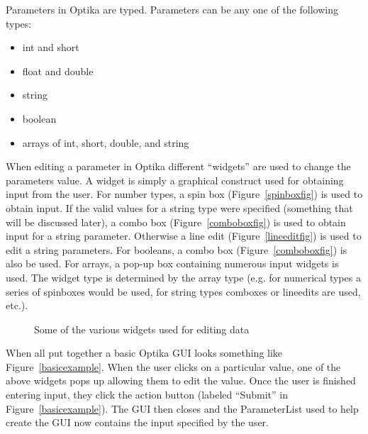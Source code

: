 Parameters in Optika are typed. Parameters can be any one of the following types:
	\begin{itemize}
		\item int and short
		\item float and double
		\item string
		\item boolean
		\item arrays of int, short, double, and string
	\end{itemize}
When editing a parameter in Optika different ``widgets'' are used to change the parameters value. A widget is simply
a graphical construct used for obtaining input from the user. For number types, a spin box (Figure~\ref{spinboxfig}) is used to obtain input. 
If the valid values for a string type were specified (something that will be discussed later), a combo box (Figure~\ref{comboboxfig}) is used to obtain
input for a string parameter.
Otherwise a line edit (Figure~\ref{lineeditfig}) is used to edit a string parameters. For booleans, a combo box (Figure~\ref{comboboxfig}) 
is also be used. For arrays, a pop-up box containing numerous input widgets is used. The widget type is determined by the
array type (e.g. for numerical types a series of spinboxes would be used, for string types comboxes or lineedits are used, etc.). 

\begin{figure}
	\centering
	\caption{Some of the various widgets used for editing data~\cite{QtGallery}}
	\label{editingWidgets}
\end{figure}

When all put together a basic Optika GUI looks something like Figure~\ref{basicexample}.
When the user clicks on a particular value, one of the above widgets pops up allowing them to edit the value.
Once the user is finished entering input, they click the action button (labeled ``Submit'' in Figure~\ref{basicexample}).
The GUI then closes and the ParameterList used to help create the GUI now contains the input specified by the user.

